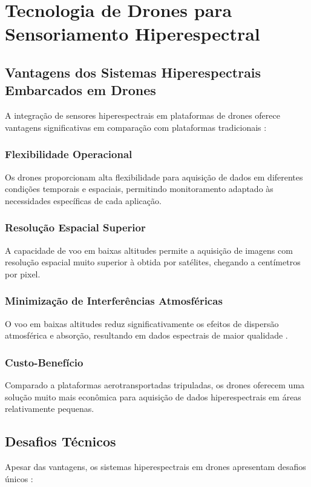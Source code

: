 \section{Tecnologia de Drones para Sensoriamento Hiperespectral}\label{sec:drones_hiperespectral}

\subsection{Vantagens dos Sistemas Hiperespectrais Embarcados em Drones}
A integração de sensores hiperespectrais em plataformas de drones oferece vantagens significativas em comparação com plataformas tradicionais \cite{Shin2024}:

\subsubsection{Flexibilidade Operacional}
Os drones proporcionam alta flexibilidade para aquisição de dados em diferentes condições temporais e espaciais, permitindo monitoramento adaptado às necessidades específicas de cada aplicação.

\subsubsection{Resolução Espacial Superior}
A capacidade de voo em baixas altitudes permite a aquisição de imagens com resolução espacial muito superior à obtida por satélites, chegando a centímetros por pixel.

\subsubsection{Minimização de Interferências Atmosféricas}
O voo em baixas altitudes reduz significativamente os efeitos de dispersão atmosférica e absorção, resultando em dados espectrais de maior qualidade \cite{Shin2024}.

\subsubsection{Custo-Benefício}
Comparado a plataformas aerotransportadas tripuladas, os drones oferecem uma solução muito mais econômica para aquisição de dados hiperespectrais em áreas relativamente pequenas.

\subsection{Desafios Técnicos}
Apesar das vantagens, os sistemas hiperespectrais em drones apresentam desafios únicos \cite{Shin2024}:

